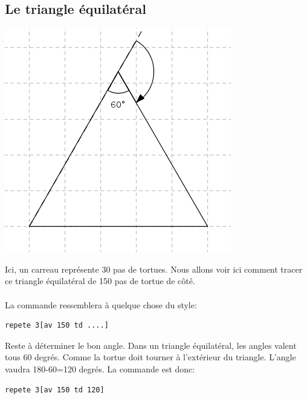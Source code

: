 \subsection{Le triangle équilatéral}
\begin{center}
\includegraphics{images/bases-triangle.png}
\end{center}
\noindent Ici, un carreau représente 30 pas de tortues. Nous allons voir ici comment tracer ce triangle équilatéral de 150 pas de tortue de côté.\\ \\
La commande ressemblera à quelque chose du style: 
\begin{verbatim}
repete 3[av 150 td ....]
\end{verbatim}
Reste à déterminer le bon angle. Dans un triangle équilatéral, les angles valent tous 60 degrés. Comme la tortue doit tourner à l'extérieur du triangle. L'angle vaudra 180-60=120 degrés. La commande est donc:
\begin{verbatim}
repete 3[av 150 td 120]
\end{verbatim}
